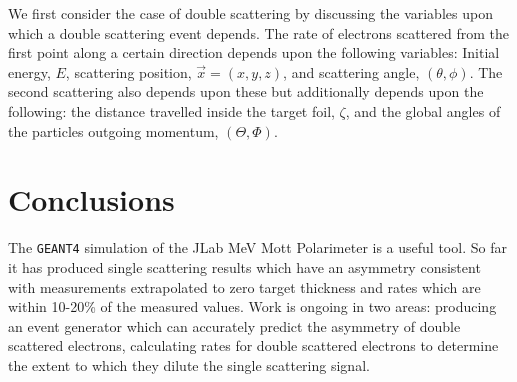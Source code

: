 \documentclass[11pt]{article}
\begin{document}
We first consider the case of double scattering by discussing the variables upon which a double scattering event depends. The rate of electrons scattered from the first point along a certain direction depends upon the following variables: Initial energy, $E$, scattering position, $\vec{x} = (x,y,z)$, and scattering angle, $(\theta,\phi)$. The second scattering also depends upon these but additionally depends upon the following: the distance travelled inside the target foil, $\zeta$, and the global angles of the particles outgoing momentum, $(\Theta,\Phi)$.


\section{Conclusions}

The \texttt{GEANT4} simulation of the JLab MeV Mott Polarimeter is a useful tool. So far it has produced single scattering results which have an asymmetry consistent with measurements extrapolated to zero target thickness and rates which are within 10-20\% of the measured values. Work is ongoing in two areas: producing an event generator which can accurately predict the asymmetry of double scattered electrons, calculating rates for double scattered electrons to determine the extent to which they dilute the single scattering signal. 
\end{document}

